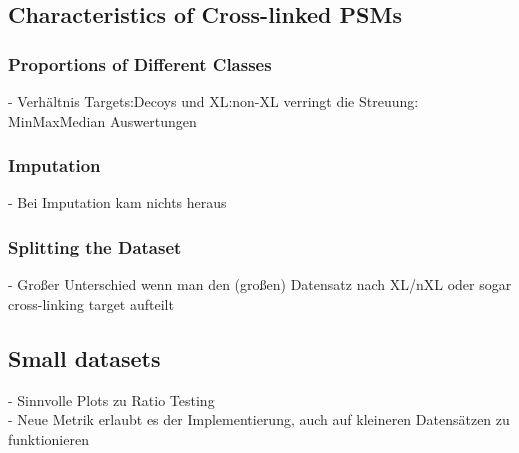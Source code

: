 \subsection{Characteristics of Cross-linked PSMs}
\subsubsection{Proportions of Different Classes}
\label{lab:results:proportions}
- Verhältnis Targets:Decoys und XL:non-XL verringt die Streuung: MinMaxMedian Auswertungen\\
\subsubsection{Imputation}
\label{lab:results:imputation}
- Bei Imputation kam nichts heraus\\
\subsubsection{Splitting the Dataset}
\label{lab:results:splitting}
- Großer Unterschied wenn man den (großen) Datensatz nach XL/nXL oder sogar cross-linking target aufteilt\\

\subsection{Small datasets}
- Sinnvolle Plots zu Ratio Testing\\
- Neue Metrik erlaubt es der Implementierung, auch auf kleineren Datensätzen zu funktionieren